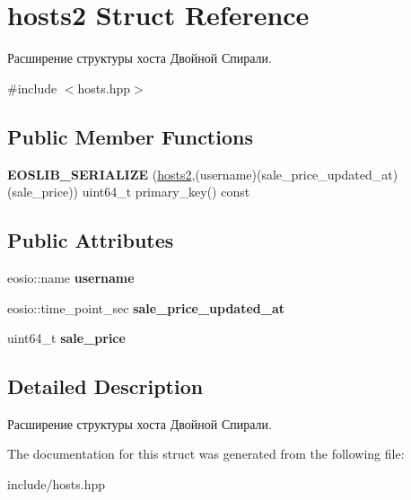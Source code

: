 \hypertarget{structhosts2}{}\section{hosts2 Struct Reference}
\label{structhosts2}


Расширение структуры хоста Двойной Спирали.  




{\ttfamily \#include $<$hosts.\+hpp$>$}

\subsection*{Public Member Functions}
\begin{DoxyCompactItemize}
\item 
\mbox{\label{structhosts2_a68dbdf967c6fc56ac256b0d6369b2e5c}} 
{\bfseries E\+O\+S\+L\+I\+B\+\_\+\+S\+E\+R\+I\+A\+L\+I\+ZE} (\mbox{\hyperlink{structhosts2}{hosts2}},(username)(sale\+\_\+price\+\_\+updated\+\_\+at)(sale\+\_\+price)) uint64\+\_\+t primary\+\_\+key() const
\end{DoxyCompactItemize}
\subsection*{Public Attributes}
\begin{DoxyCompactItemize}
\item 
\mbox{\label{structhosts2_abe43d4f81e560ed0d064e37f72ea29aa}} 
eosio\+::name {\bfseries username}
\item 
\mbox{\label{structhosts2_a0b5d9184976b6386bbd926d7099d69ac}} 
eosio\+::time\+\_\+point\+\_\+sec {\bfseries sale\+\_\+price\+\_\+updated\+\_\+at}
\item 
\mbox{\label{structhosts2_ada9a20ae223bc40d035d4b89c3b0f155}} 
uint64\+\_\+t {\bfseries sale\+\_\+price}
\end{DoxyCompactItemize}


\subsection{Detailed Description}
Расширение структуры хоста Двойной Спирали. 

The documentation for this struct was generated from the following file\+:\begin{DoxyCompactItemize}
\item 
include/hosts.\+hpp\end{DoxyCompactItemize}

